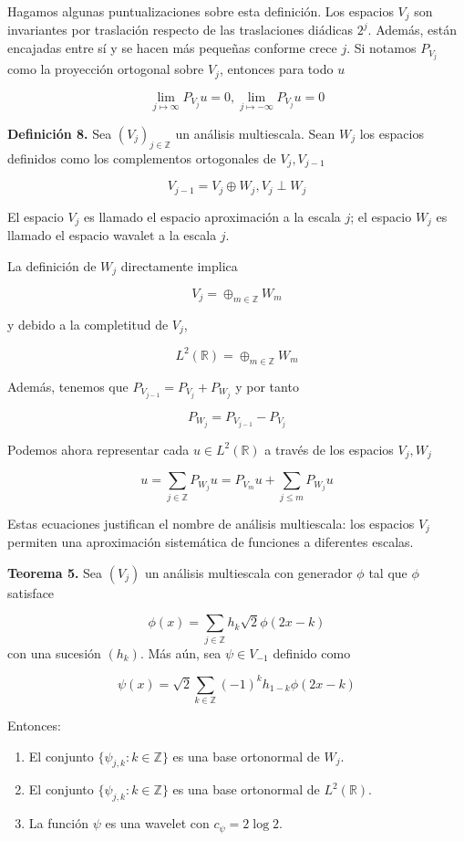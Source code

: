 \begin{itemize}
Hagamos algunas puntualizaciones sobre esta definición. Los espacios $V_j$ son invariantes por traslación respecto de las traslaciones diádicas $2^j$. Además, están encajadas entre sí y se hacen más pequeñas conforme crece $j$. Si notamos $P_{V_j}$ como la proyección ortogonal sobre $V_j$, entonces para todo $u$ 

$$\lim_{j \mapsto \infty} P_{V_j} u = 0, \lim_{j \mapsto -\infty} P_{V_j} u = 0$$

\textbf{Definición 8.} Sea $(V_j)_{j \in \mathbb{Z}}$ un análisis multiescala. Sean $W_j$ los espacios definidos como los complementos ortogonales de $V_j, V_{j-1}$

$$V_{j-1} = V_j \oplus W_j, V_j \perp W_j$$

El espacio $V_j$ es llamado el espacio aproximación a la escala $j$; el espacio $W_j$ es llamado el espacio wavalet a la escala $j$.

La definición de $W_j$ directamente implica

$$V_j = \oplus_{m \in \mathbb{Z}} W_m$$

y debido a la completitud de $V_j$,

$$L^2(\mathbb{R}) =   \oplus_{m \in \mathbb{Z}} W_m$$

Además, tenemos que $P_{V_{j-1}} = P_{V_j} + P_{W_j}$ y por tanto

$$ P_{W_j} = P_{V_{j-1}} - P_{V_j}$$

Podemos ahora representar cada $u \in L^2(\mathbb{R})$ a través de los espacios $V_j, W_j$ 

$$ u = \sum_{j \in \mathbb{Z}}P_{W_j}u = P_{V_m}u + \sum_{j \leq m}P_{W_j}u$$

Estas ecuaciones justifican el nombre de análisis multiescala: los espacios $V_j$ permiten una aproximación sistemática de funciones a diferentes escalas.

\textbf{Teorema 5.} Sea $(V_j)$ un análisis multiescala con generador $\phi$ tal que $\phi$ satisface 

$$\phi(x) = \sum_{j \in \mathbb{Z}} h_k \sqrt{2} \phi(2x-k)$$ 
con una sucesión $(h_k)$. Más aún, sea $\psi \in V_{-1}$ definido como

$$\psi(x) = \sqrt{2} \sum_{k \in \mathbb{Z}} (-1)^k h_{1-k}\phi(2x-k)$$

Entonces:

\begin{enumerate}
	\item El conjunto $\{\psi_{j,k}: k\in \mathbb{Z} \}$ es una base ortonormal de $W_j$.
	\item El conjunto $\{\psi_{j,k}: k\in \mathbb{Z} \}$ es una base ortonormal de $L^2(\mathbb{R})$.
	\item La función $\psi$ es una wavelet con $c_\psi = 2 \log 2$.
\end{enumerate}


\end{itemize}
